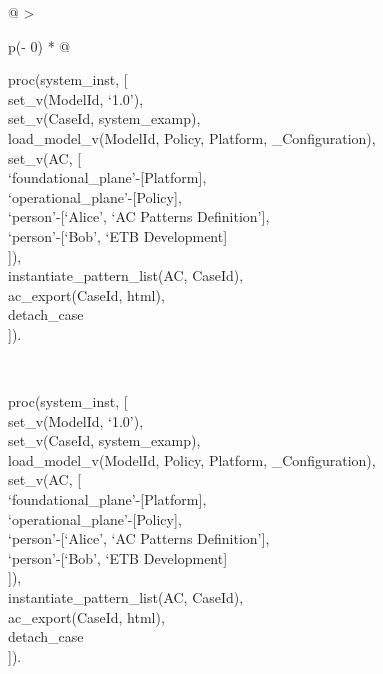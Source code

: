 \documentclass[12pt,twoside,a4paper]{article}
\begin{document}
\begin{longtable}[]{@{}
  >{\raggedright\arraybackslash}p{(\columnwidth - 0\tabcolsep) * }@{}}
\caption{\protect\hypertarget{_Ref168412244}{}{}Table Example 3 -- instantiating a pattern list from a model and exporting as HTML}\tabularnewline
\toprule
\begin{minipage}[b]{\linewidth}\raggedright
proc(system\_inst, {[}\\
set\_v(ModelId, `1.0'),\\
set\_v(CaseId, system\_examp),\\
load\_model\_v(ModelId, Policy, Platform, \_Configuration),\\
set\_v(AC, {[}\\
`foundational\_plane'-{[}Platform{]},\\
`operational\_plane'-{[}Policy{]},\\
`person'-{[}`Alice', `AC Patterns Definition'{]},\\
`person'-{[}`Bob', `ETB Development{]}\\
{]}),\\
instantiate\_pattern\_list(AC, CaseId),\\
ac\_export(CaseId, html),\\
detach\_case\\
{]}).\strut
\end{minipage} \\
\midrule
\endfirsthead
\toprule
\begin{minipage}[b]{\linewidth}\raggedright
proc(system\_inst, {[}\\
set\_v(ModelId, `1.0'),\\
set\_v(CaseId, system\_examp),\\
load\_model\_v(ModelId, Policy, Platform, \_Configuration),\\
set\_v(AC, {[}\\
`foundational\_plane'-{[}Platform{]},\\
`operational\_plane'-{[}Policy{]},\\
`person'-{[}`Alice', `AC Patterns Definition'{]},\\
`person'-{[}`Bob', `ETB Development{]}\\
{]}),\\
instantiate\_pattern\_list(AC, CaseId),\\
ac\_export(CaseId, html),\\
detach\_case\\
{]}).\strut
\end{minipage} \\
\midrule
\endhead
\bottomrule
\end{longtable}
\end{document}
